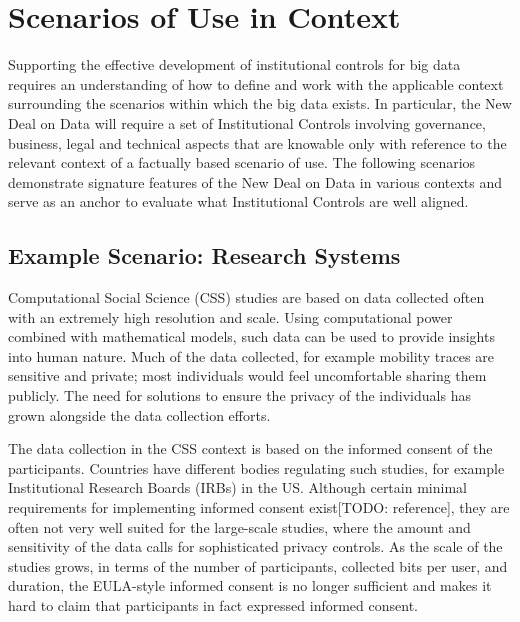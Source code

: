 \section{Scenarios of Use in Context}

Supporting the effective development of institutional controls for big data requires an understanding of how to define and work with the applicable context surrounding the scenarios within which the big data exists. In particular, the New Deal on Data will require a set of Institutional Controls involving governance, business, legal and technical aspects that are knowable only with reference to the relevant context of a factually based scenario of use. The following scenarios demonstrate signature features of the New Deal on Data in various contexts and serve as an anchor to evaluate what Institutional Controls are well aligned.

\subsection{Example Scenario: Research Systems}

Computational Social Science (CSS) studies are based on data collected often with an extremely high resolution and scale. Using computational power combined with mathematical models, such data can be used to provide insights into human nature. Much of the data collected, for example mobility traces are sensitive and private; most individuals would feel uncomfortable sharing them publicly. The need for solutions to ensure the privacy of the individuals has grown alongside the data collection efforts.

The data collection in the CSS context is based on the informed consent of the participants. Countries have different bodies regulating such studies, for example Institutional Research Boards (IRBs) in the US. Although certain minimal requirements for implementing informed consent exist[TODO: reference], they are often not very well suited for the large-scale studies, where the amount and sensitivity of the data calls for sophisticated privacy controls. As the scale of the studies grows, in terms of the number of participants, collected bits per user, and duration, the EULA-style informed consent is no longer sufficient and makes it hard to claim that participants in fact expressed informed consent.

